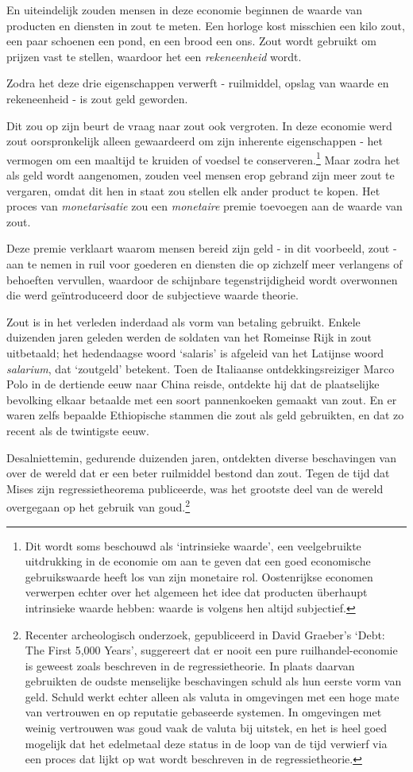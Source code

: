 \documentclass[
  a5paper,
  smalldemyvopaper,11pt,twoside,onecolumn,openright,extrafontsizes]{memoir}
\begin{document}
En uiteindelijk zouden mensen in deze economie beginnen de waarde van
producten en diensten in zout te meten. Een horloge kost misschien een
kilo zout, een paar schoenen een pond, en een brood een ons. Zout wordt
gebruikt om prijzen vast te stellen, waardoor het een
\emph{rekeneenheid} wordt.

Zodra het deze drie eigenschappen verwerft - ruilmiddel, opslag van
waarde en rekeneenheid - is zout geld geworden.

Dit zou op zijn beurt de vraag naar zout ook vergroten. In deze economie
werd zout oorspronkelijk alleen gewaardeerd om zijn inherente
eigenschappen - het vermogen om een maaltijd te kruiden of voedsel te
conserveren.\footnote{Dit wordt soms beschouwd als `intrinsieke waarde',
  een veelgebruikte uitdrukking in de economie om aan te geven dat een
  goed economische gebruikswaarde heeft los van zijn monetaire rol.
  Oostenrijkse economen verwerpen echter over het algemeen het idee dat
  producten überhaupt intrinsieke waarde hebben: waarde is volgens hen
  altijd subjectief.} Maar zodra het als geld wordt aangenomen, zouden
veel mensen erop gebrand zijn meer zout te vergaren, omdat dit hen in
staat zou stellen elk ander product te kopen. Het proces van
\emph{monetarisatie} zou een \emph{monetaire} premie toevoegen aan de
waarde van zout.

Deze premie verklaart waarom mensen bereid zijn geld - in dit voorbeeld,
zout - aan te nemen in ruil voor goederen en diensten die op zichzelf
meer verlangens of behoeften vervullen, waardoor de schijnbare
tegenstrijdigheid wordt overwonnen die werd geïntroduceerd door de
subjectieve waarde theorie.

Zout is in het verleden inderdaad als vorm van betaling gebruikt. Enkele
duizenden jaren geleden werden de soldaten van het Romeinse Rijk in zout
uitbetaald; het hedendaagse woord `salaris' is afgeleid van het Latijnse
woord \emph{salarium}, dat `zoutgeld' betekent. Toen de Italiaanse
ontdekkingsreiziger Marco Polo in de dertiende eeuw naar China reisde,
ontdekte hij dat de plaatselijke bevolking elkaar betaalde met een soort
pannenkoeken gemaakt van zout. En er waren zelfs bepaalde Ethiopische
stammen die zout als geld gebruikten, en dat zo recent als de twintigste
eeuw.

Desalniettemin, gedurende duizenden jaren, ontdekten diverse
beschavingen van over de wereld dat er een beter ruilmiddel bestond dan
zout. Tegen de tijd dat Mises zijn regressietheorema publiceerde, was
het grootste deel van de wereld overgegaan op het gebruik van
goud.\footnote{Recenter archeologisch onderzoek, gepubliceerd in David
  Graeber's `Debt: The First 5,000 Years', suggereert dat er nooit een
  pure ruilhandel-economie is geweest zoals beschreven in de
  regressietheorie. In plaats daarvan gebruikten de oudste menselijke
  beschavingen schuld als hun eerste vorm van geld. Schuld werkt echter
  alleen als valuta in omgevingen met een hoge mate van vertrouwen en op
  reputatie gebaseerde systemen. In omgevingen met weinig vertrouwen was
  goud vaak de valuta bij uitstek, en het is heel goed mogelijk dat het
  edelmetaal deze status in de loop van de tijd verwierf via een proces
  dat lijkt op wat wordt beschreven in de regressietheorie.}
\end{document}
